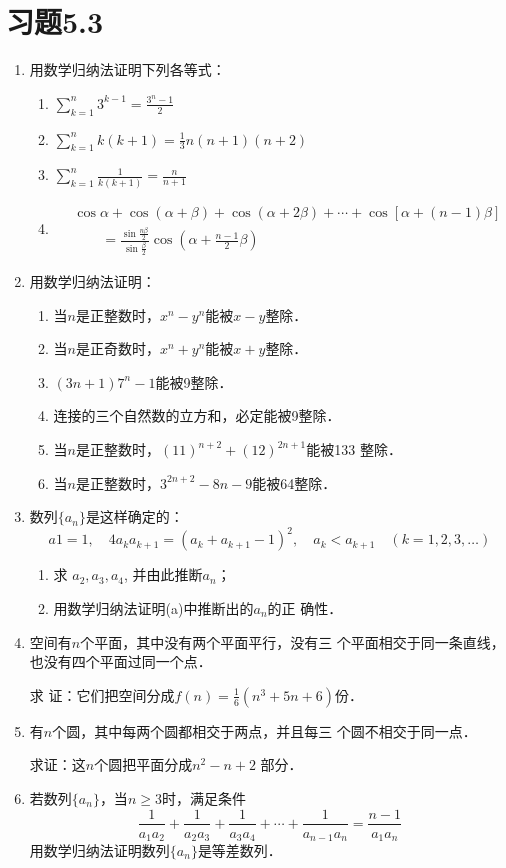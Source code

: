 \section*{习题5.3}
\begin{enumerate}
    \item 用数学归纳法证明下列各等式：
\begin{enumerate}
    \item $\displaystyle\sum^n_{k=1}3^{k-1}=\frac{3^n-1}{2}$
    \item $\displaystyle\sum^n_{k=1}k(k+1)=\frac{1}{3}n(n+1)(n+2)$
    \item $\displaystyle\sum^n_{k=1}\frac{1}{k(k+1)}=\frac{n}{n+1}$
    \item \[ \begin{split}
      & \cos\alpha+\cos(\alpha+\beta)+\cos(\alpha+2\beta)+\cdots+\cos[\alpha+(n-1)\beta]\\
      &\qquad =\frac{\sin\frac{n\beta}{2}}{\sin\frac{\beta}{2}}\cos\left(\alpha+\frac{n-1}{2}\beta\right)
    \end{split}\]
\end{enumerate}

\item 用数学归纳法证明：
\begin{enumerate}
\item 当$n$是正整数时，$x^n-y^n$能被$x-y$整除．
\item 当$n$是正奇数时，$x^n+y^n$能被$x+y$整除．
\item $(3n+1)7^n-1$能被9整除．
\item 连接的三个自然数的立方和，必定能被9整除．
\item 当$n$是正整数时，$(11)^{n+2}+(12)^{2n+1}$能被133
整除．
\item 当$n$是正整数时，$3^{2n+2}-8n-9$能被64整除．
\end{enumerate}

\item 数列$\{a_n\}$是这样确定的：
\[a1=1,\quad 4a_ka_{k+1}=(a_k+a_{k+1}-1)^2,\quad a_k<a_{k+1}\quad (k=1,2,3,\ldots)\]
\begin{enumerate}
    \item 求 $a_2,a_3,a_4$, 并由此推断$a_n$；
    \item 用数学归纳法证明(a)中推断出的$a_n$的正
确性．
\end{enumerate}

\item 空间有$n$个平面，其中没有两个平面平行，没有三
个平面相交于同一条直线，也没有四个平面过同一个点．

求
证：它们把空间分成$f(n)=\frac{1}{6}
(n^3+5n+6)$份．
\item 有$n$个圆，其中每两个圆都相交于两点，并且每三
个圆不相交于同一点．

求证：这$n$个圆把平面分成$n^2-n+2$
部分．

\item 若数列$\{a_n\}$，当$n\ge 3$时，满足条件
\[\frac{1}{a_1a_2}+\frac{1}{a_2a_3}+\frac{1}{a_3a_4}+\cdots+\frac{1}{a_{n-1}a_n}=\frac{n-1}{a_1a_n}\]
用数学归纳法证明数列$\{a_n\}$是等差数列．
\end{enumerate}
